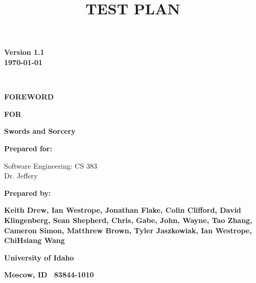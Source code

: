 \title {TEST PLAN}


{\centering{}\bfseries\color{black}
Version 1.1\\
\today
\par}

\ 

{\centering{}\bfseries\color{black}
FOREWORD
\par}
\bigskip

{\centering{}\bfseries\color{black}
FOR
\par}


\bigskip

{\centering{}\bfseries\color{black}
Swords and Sorcery
\par}




\begin{figure}
\centering
\end{figure}

\bigskip


\bigskip

{\centering{}\bfseries\color{black}
Prepared for: 
\par
Software Engineering: CS 383\\
Dr. Jeffery
\par}

\bigskip


\bigskip

{\centering{}\bfseries\color{black}
Prepared by:
\par}

{\centering{}\bfseries\color{black}
Keith Drew,
 Ian Westrope,
 Jonathan Flake,
 Colin Clifford,
 David Klingenberg,
 Sean Shepherd,
 Chris,
 Gabe,
 John,
 Wayne, 
 Tao Zhang,
 Cameron Simon,
 Matthrew Brown,
 Tyler Jaszkowiak,
 Ian Westrope,
 ChiHsiang Wang
\par}

\bigskip

{\centering{}\bfseries\color{black}
University of Idaho
\par}

{\centering{}\bfseries\color{black}
Moscow, ID \ 83844-1010
\par}



\pagebreak

